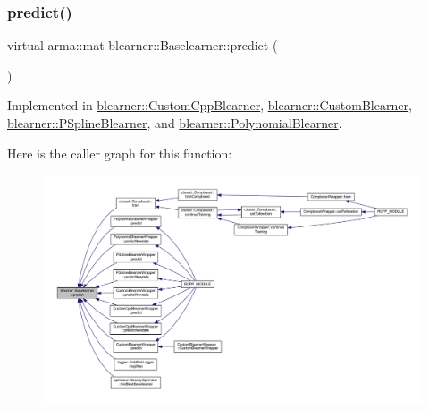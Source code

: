\subsubsection{\texorpdfstring{predict()}{predict()}\hspace{0.1cm}{\footnotesize\ttfamily [1/2]}}
{\footnotesize\ttfamily virtual arma\+::mat blearner\+::\+Baselearner\+::predict (\begin{DoxyParamCaption}{ }\end{DoxyParamCaption})\hspace{0.3cm}{\ttfamily [pure virtual]}}



Implemented in \mbox{\hyperlink{classblearner_1_1_custom_cpp_blearner_aa17db5f5627b8251b2d8484d92e783b9}{blearner\+::\+Custom\+Cpp\+Blearner}}, \mbox{\hyperlink{classblearner_1_1_custom_blearner_a20b5fe06512aa73478b9f934e1c81c31}{blearner\+::\+Custom\+Blearner}}, \mbox{\hyperlink{classblearner_1_1_p_spline_blearner_aa46e4474a352876fbfad64921254f6d5}{blearner\+::\+P\+Spline\+Blearner}}, and \mbox{\hyperlink{classblearner_1_1_polynomial_blearner_a422569884414d31db5a2b770b22176c3}{blearner\+::\+Polynomial\+Blearner}}.

Here is the caller graph for this function\+:
\nopagebreak
\begin{figure}[H]
\begin{center}
\leavevmode
\includegraphics[width=350pt]{classblearner_1_1_baselearner_ab37986047db43c84420fef2cef7fc20d_icgraph}
\end{center}
\end{figure}
\mbox{\label{classblearner_1_1_baselearner_ae2ef5e018783578e02b3b5a33fa94eae}} 
